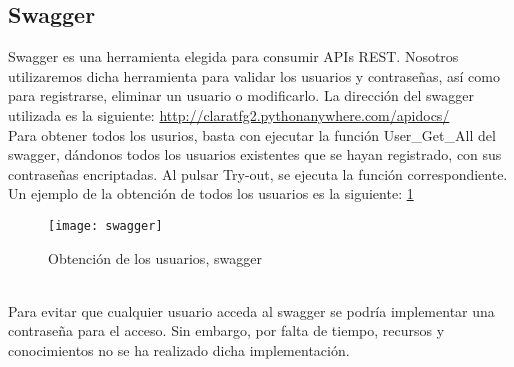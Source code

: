 \subsection{Swagger}
Swagger es una herramienta elegida para consumir APIs REST. Nosotros utilizaremos dicha herramienta para validar los usuarios y contraseñas, así como para registrarse, eliminar un usuario o modificarlo. 
La dirección del swagger utilizada es la siguiente:  \url{http://claratfg2.pythonanywhere.com/apidocs/}
\\Para obtener todos los usurios, basta con ejecutar la función User\_Get\_All del swagger, dándonos todos los usuarios existentes que se hayan registrado,  con sus contraseñas encriptadas. Al pulsar Try-out, se ejecuta la función correspondiente. Un ejemplo de la obtención de todos los usuarios es la siguiente: \ref{fig:D.1.6}
\begin{figure}[h]
\centering
\texttt{[image: swagger]}
\caption{Obtención de los usuarios, swagger}
\label{fig:D.1.6}
\end{figure}
\\Para evitar que cualquier usuario acceda al swagger se podría implementar una contraseña para el acceso. Sin embargo, por falta de tiempo, recursos y conocimientos no se ha realizado dicha implementación. 
